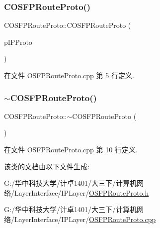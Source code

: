 \subsubsection{\texorpdfstring{C\+O\+S\+F\+P\+Route\+Proto()}{COSFPRouteProto()}}
{\footnotesize\ttfamily C\+O\+S\+F\+P\+Route\+Proto\+::\+C\+O\+S\+F\+P\+Route\+Proto (\begin{DoxyParamCaption}\item[{\hyperlink{class_c_i_p_layer}{C\+I\+P\+Layer} $\ast$}]{p\+I\+P\+Proto }\end{DoxyParamCaption})}



在文件 O\+S\+F\+P\+Route\+Proto.\+cpp 第 5 行定义.

\mbox{\label{class_c_o_s_f_p_route_proto_a9a16b32c83097c2273bd73da0cf491da}} 
\subsubsection{\texorpdfstring{$\sim$\+C\+O\+S\+F\+P\+Route\+Proto()}{~COSFPRouteProto()}}
{\footnotesize\ttfamily C\+O\+S\+F\+P\+Route\+Proto\+::$\sim$\+C\+O\+S\+F\+P\+Route\+Proto (\begin{DoxyParamCaption}{ }\end{DoxyParamCaption})}



在文件 O\+S\+F\+P\+Route\+Proto.\+cpp 第 10 行定义.



该类的文档由以下文件生成\+:\begin{DoxyCompactItemize}
\item 
G\+:/华中科技大学/计卓1401/大三下/计算机网络/\+Layer\+Interface/\+I\+P\+Layer/\hyperlink{_o_s_f_p_route_proto_8h}{O\+S\+F\+P\+Route\+Proto.\+h}\item 
G\+:/华中科技大学/计卓1401/大三下/计算机网络/\+Layer\+Interface/\+I\+P\+Layer/\hyperlink{_o_s_f_p_route_proto_8cpp}{O\+S\+F\+P\+Route\+Proto.\+cpp}\end{DoxyCompactItemize}
